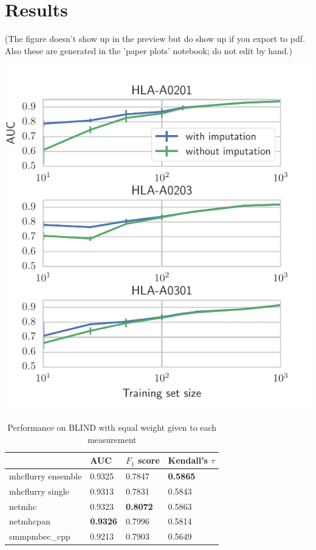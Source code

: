 \section{Results}
(The figure doesn't show up in the preview but do show up if you export to pdf. Also these are generated in the 'paper plots' notebook; do not edit by hand.)

\includegraphics{figures/impute_comparison.pdf}

\begin{table}[h]
\centering
\begin{tabular}{llll}
\toprule
{} &              AUC &      $F_1$ score & Kendall's $\tau$ \\
\midrule
mhcflurry ensemble &           0.9325 &           0.7847 &  \textbf{0.5865} \\
mhcflurry single   &           0.9313 &           0.7831 &           0.5843 \\
netmhc             &           0.9323 &  \textbf{0.8072} &           0.5863 \\
netmhcpan          &  \textbf{0.9326} &           0.7996 &           0.5814 \\
smmpmbec_cpp       &           0.9213 &           0.7903 &           0.5649 \\
\bottomrule
\end{tabular}

\caption{Performance on BLIND with equal weight given to each measurement}
\label{tab:measurementweighted}
\end{table}


